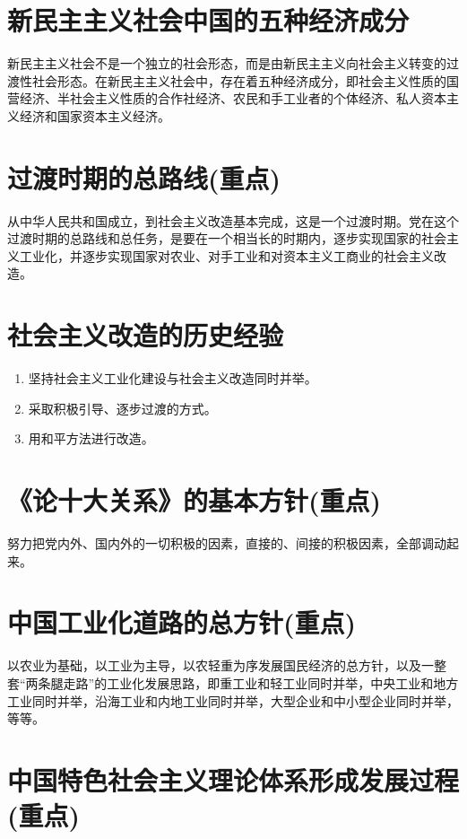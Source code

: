 \documentclass[12pt, a4paper, oneside]{ctexbook}
\begin{document}
\section{新民主主义社会中国的五种经济成分}

新民主主义社会不是一个独立的社会形态，而是由新民主主义向社会主义转变的过渡性社会形态。在新民主主义社会中，存在着五种经济成分，即社会主义性质的国营经济、半社会主义性质的合作社经济、农民和手工业者的个体经济、私人资本主义经济和国家资本主义经济。

\section{过渡时期的总路线(重点)}

从中华人民共和国成立，到社会主义改造基本完成，这是一个过渡时期。党在这个过渡时期的总路线和总任务，是要在一个相当长的时期内，逐步实现国家的社会主义工业化，并逐步实现国家对农业、对手工业和对资本主义工商业的社会主义改造。

\section{社会主义改造的历史经验}

\begin{enumerate}
\item 坚持社会主义工业化建设与社会主义改造同时并举。

\item 采取积极引导、逐步过渡的方式。

\item 用和平方法进行改造。
\end{enumerate}

\section{《论十大关系》的基本方针(重点)}

努力把党内外、国内外的一切积极的因素，直接的、间接的积极因素，全部调动起来。

\section{中国工业化道路的总方针(重点)}

以农业为基础，以工业为主导，以农轻重为序发展国民经济的总方针，以及一整套“两条腿走路”的工业化发展思路，即重工业和轻工业同时并举，中央工业和地方工业同时并举，沿海工业和内地工业同时并举，大型企业和中小型企业同时并举，等等。

\section{中国特色社会主义理论体系形成发展过程(重点)}
\end{document}
